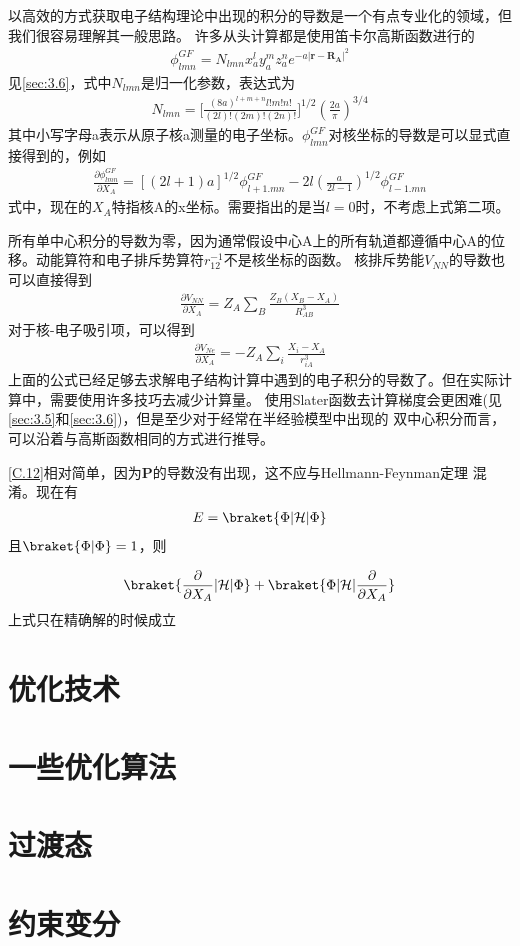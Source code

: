 以高效的方式获取电子结构理论中出现的积分的导数是一个有点专业化的领域，但我们很容易理解其一般思路。
许多从头计算都是使用笛卡尔高斯函数进行的
\begin{align}
	\nonumber
    \phi_{lmn}^{GF}=N_{lmn}x_{a}^{l}y_{a}^{m}z_{a}^{n} e^{-a|\mathbf{r}-\mathbf{R_{A}}|^2} 
\end{align}
见\autoref{sec:3.6}，式中$N_{lmn}$是归一化参数，表达式为
\begin{align}
	\nonumber
    N_{lmn}=\bigg[\frac{(8a)^{l+m+n}l!m!n!}{(2l)!(2m)!(2n)!} \bigg]^{1/2}(\frac{2a}{\pi})^{3/4}
\end{align}
其中小写字母a表示从原子核a测量的电子坐标。$\phi_{lmn}^{GF}$对核坐标的导数是可以显式直接得到的，例如
\begin{align}
	\nonumber
    \frac{\partial \phi_{lmn}^{GF}}{\partial X_A}=[(2l+1)a]^{1/2}\phi_{l+1.mn}^{GF}-2l(\frac{a}{2l-1})^{1/2}\phi_{l-1.mn}^{GF}
\end{align}
式中，现在的$X_A$特指核A的x坐标。需要指出的是当$l=0$时，不考虑上式第二项。

所有单中心积分的导数为零，因为通常假设中心A上的所有轨道都遵循中心A的位移。动能算符和电子排斥势算符$r_{12}^{-1}$不是核坐标的函数。
核排斥势能$V_{NN}$的导数也可以直接得到
\begin{align}
	\nonumber
    \frac{\partial V_{NN}}{\partial X_A}=Z_A\sum_{B}\frac{Z_B(X_B-X_A)}{R_{AB}^{3}}
\end{align}
对于核-电子吸引项，可以得到
\begin{align}
	\nonumber
    \frac{\partial V_{Ne}}{\partial X_A}=-Z_A\sum_{i}\frac{X_i-X_A}{r_{iA}^{3}}
\end{align}
上面的公式已经足够去求解电子结构计算中遇到的电子积分的导数了。但在实际计算中，需要使用许多技巧去减少计算量。
使用Slater函数去计算梯度会更困难(见\autoref{sec:3.5}和\autoref{sec:3.6})，但是至少对于经常在半经验模型中出现的
双中心积分而言，可以沿着与高斯函数相同的方式进行推导。

\autoref{C.12}相对简单，因为$\mathbf{P}$的导数没有出现，这不应与Hellmann-Feynman定理
混淆。现在有
\begin{align}
	\nonumber
    E= \braket{\Phi |\mathcal{H} |\Phi }
\end{align}
且$\braket{\Phi |\Phi }=1$，则

\begin{align}
	\label{C.14}
    \braket{\frac{\partial }{\partial X_A} |\mathcal{H} |\Phi }+ \braket{\Phi|\mathcal{H} | \frac{\partial }{\partial X_A} }
\end{align}
上式只在精确解的时候成立
\section{优化技术}
\section{一些优化算法}
\section{过渡态}
\section{约束变分}
\newpage
\theendnotes
{}